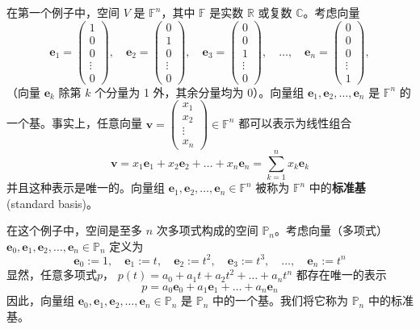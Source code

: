 \begin{example}{2.2}
在第一个例子中，空间 ${V}$ 是 $\mathbb{F}^n$，其中 $\mathbb{F}$ 是实数 $\mathbb{R}$ 或复数 $\mathbb{C}$。考虑向量
$$ \mathbf{e}_1 = \begin{pmatrix} 1 \\ 0 \\ 0 \\ \vdots \\ 0 \end{pmatrix}, \quad \mathbf{e}_2 = \begin{pmatrix} 0 \\ 1 \\ 0 \\ \vdots \\ 0 \end{pmatrix}, \quad \mathbf{e}_3 = \begin{pmatrix} 0 \\ 0 \\ 1 \\ \vdots \\ 0 \end{pmatrix}, \quad \dots, \quad \mathbf{e}_n = \begin{pmatrix} 0 \\ 0 \\ 0 \\ \vdots \\ 1 \end{pmatrix} ,$$
（向量 $\mathbf{e}_k$ 除第 $k$ 个分量为 1 外，其余分量均为 0）。向量组 $\mathbf{e}_1, \mathbf{e}_2, \dots, \mathbf{e}_n$ 是 $\mathbb{F}^n$ 的一个基。事实上，任意向量 $\mathbf{v} = \begin{pmatrix} x_1 \\ x_2 \\ \vdots \\ x_n \end{pmatrix} \in \mathbb{F}^n$ 都可以表示为线性组合
$$ \mathbf{v} = x_1 \mathbf{e}_1 + x_2 \mathbf{e}_2 + \dots + x_n \mathbf{e}_n = \sum_{k=1}^n x_k \mathbf{e}_k $$
并且这种表示是唯一的。向量组 $\mathbf{e}_1, \mathbf{e}_2, \dots, \mathbf{e}_n \in \mathbb{F}^n$ 被称为 $\mathbb{F}^n$ 中的\textbf{标准基}(standard basis)。
\end{example}

\begin{example}{2.3}
在这个例子中，空间是至多 $n$ 次多项式构成的空间 $\mathbb{P}_n$。考虑向量（多项式） $\mathbf{e}_0, \mathbf{e}_1, \mathbf{e}_2, \dots, \mathbf{e}_n \in \mathbb{P}_n$ 定义为
$$ \mathbf{e}_0 := 1, \quad \mathbf{e}_1 := t, \quad \mathbf{e}_2 := t^2, \quad \mathbf{e}_3 := t^3, \quad \dots, \quad \mathbf{e}_n := t^n $$
显然，任意多项式$p$， $p(t) = a_0 + a_1 t + a_2 t^2 + \dots + a_n t^n$ 都存在唯一的表示
$$ p = a_0 \mathbf{e}_0 + a_1 \mathbf{e}_1 + \dots + a_n \mathbf{e}_n $$
因此，向量组 $\mathbf{e}_0, \mathbf{e}_1, \mathbf{e}_2, \dots, \mathbf{e}_n \in \mathbb{P}_n$ 是 $\mathbb{P}_n$ 中的一个基。我们将它称为 $\mathbb{P}_n$ 中的标准基。
\end{example}


